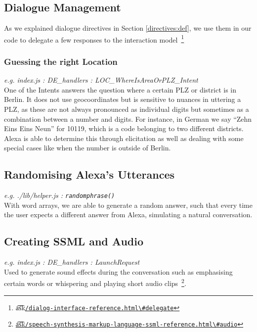 \subsection*{Dialogue Management}
As we explained dialogue directives in Section \ref{directives:def}, we use them in our code to delegate a few responses to the interaction model~\footnote{ \t{a\t{sk}}\href{https://developer.amazon.com/docs/custom-skills/dialog-interface-reference.html\#delegate}{\lstinline|/dialog-interface-reference.html\#delegate|}	
}


\subsubsection*{Guessing the right Location}
\textit{e.g. index.js \quad : \quad  DE\_handlers \quad :  \quad LOC\_WhereIsAreaOrPLZ\_Intent}\\
One of the Intents answers the question where a certain PLZ or district is in Berlin. It does not use geocoordinates but is sensitive to nuances in uttering a PLZ, as these are not always pronounced as individual digits but sometimes as a combination between a number and digits. For instance, in German we say ``Zehn Eins Eins Neun'' for 10119, which is a code belonging to two different districts. Alexa is able to determine this through elicitation as well as dealing with some special cases like when the number is outside of Berlin.





\subsection*{Randomising Alexa's Utterances}
\textit{e.g. ./lib/helper.js \quad : \quad  \texttt{randomphrase()}} \\
With word arrays, we are able to generate a random answer, such that every time the user expects a different answer from Alexa, simulating a natural conversation. %



\subsection*{Creating SSML and Audio}
\textit{e.g. index.js \quad : \quad  DE\_handlers \quad :  \quad LaunchRequest}\\
Used to generate sound effects during the conversation such as emphasising certain words or whispering and playing short audio clips~\footnote{\href{https://developer.amazon.com/docs/custom-skills/speech-synthesis-markup-language-ssml-reference.html\#audio}{\t{a\t{sk}}\lstinline|/speech-synthesis-markup-language-ssml-reference.html\#audio|}}.







